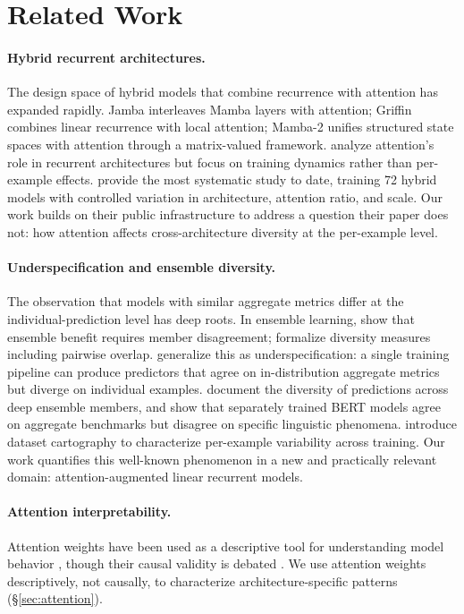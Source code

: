 \documentclass[11pt,twocolumn]{article}
\begin{document}
\section{Related Work}

\paragraph{Hybrid recurrent architectures.}
The design space of hybrid models that combine recurrence with attention has expanded rapidly.
Jamba \citep{lieber2024jamba} interleaves Mamba layers with attention; Griffin \citep{de2024griffin} combines linear recurrence with local attention; Mamba-2 \citep{dao2024transformers} unifies structured state spaces with attention through a matrix-valued framework.
\citet{arora2024simple} analyze attention's role in recurrent architectures but focus on training dynamics rather than per-example effects.
\citet{wang2025mamba} provide the most systematic study to date, training 72 hybrid models with controlled variation in architecture, attention ratio, and scale.
Our work builds on their public infrastructure to address a question their paper does not: how attention affects cross-architecture diversity at the per-example level.

\paragraph{Underspecification and ensemble diversity.}
The observation that models with similar aggregate metrics differ at the individual-prediction level has deep roots.
In ensemble learning, \citet{krogh1994neural} show that ensemble benefit requires member disagreement; \citet{kuncheva2003measures} formalize diversity measures including pairwise overlap.
\citet{damour2022underspecification} generalize this as underspecification: a single training pipeline can produce predictors that agree on in-distribution aggregate metrics but diverge on individual examples.
\citet{fort2019deep} document the diversity of predictions across deep ensemble members, and \citet{mccoy2020berts} show that separately trained BERT models agree on aggregate benchmarks but disagree on specific linguistic phenomena.
\citet{swayamdipta2020dataset} introduce dataset cartography to characterize per-example variability across training.
Our work quantifies this well-known phenomenon in a new and practically relevant domain: attention-augmented linear recurrent models.

\paragraph{Attention interpretability.}
Attention weights have been used as a descriptive tool for understanding model behavior \citep{clark2019what,vig2019multiscale}, though their causal validity is debated \citep{jain2019attention,wiegreffe2019attention}.
We use attention weights descriptively, not causally, to characterize architecture-specific patterns (\S\ref{sec:attention}).
\end{document}
